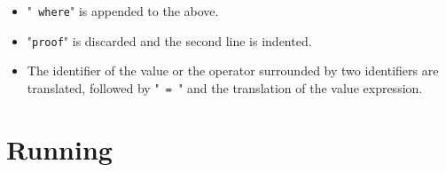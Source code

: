 \documentclass{article}
\begin{document}
\begin{itemize}
\begin{itemize}
\item
"\texttt{ where}" is appended to the above.

\item
"\texttt{proof}" is discarded and the second line is indented.

\item
The identifier of the value or the operator surrounded by two identifiers
are translated, followed by "\texttt{ = }" and the translation of the value
expression.

\end{itemize}

\end{itemize}

\newpage
\section{Running}
\end{document}

